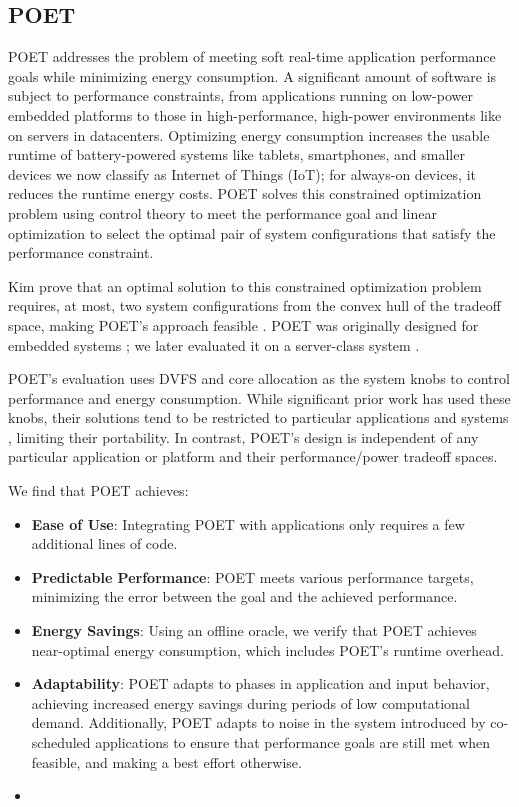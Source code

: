 \subsection{POET}

POET addresses the problem of meeting soft real-time application performance goals while minimizing energy consumption.
A significant amount of software is subject to performance constraints, from applications running on low-power embedded platforms to those in high-performance, high-power environments like on servers in datacenters.
Optimizing energy consumption increases the usable runtime of battery-powered systems like tablets, smartphones, and smaller devices we now classify as Internet of Things (IoT); for always-on devices, it reduces the runtime energy costs.
POET solves this constrained optimization problem using control theory to meet the performance goal and linear optimization to select the optimal pair of system configurations that satisfy the performance constraint.

Kim \etal prove that an optimal solution to this constrained optimization problem requires, at most, two system configurations from the convex hull of the tradeoff space, making POET's approach feasible \cite{kim-cpsna2015}.
POET was originally designed for embedded systems \cite{POET,ImesMS}; we later evaluated it on a server-class system \cite{POETMCSoC}.

POET's evaluation uses DVFS and core allocation as the system knobs to control performance and energy consumption.
While significant prior work has used these knobs, their solutions tend to be restricted to particular applications \cite{TODO} and systems \cite{TODO}, limiting their portability.
In contrast, POET's design is independent of any particular application or platform and their performance/power tradeoff spaces.

We find that POET achieves:
\begin{itemize}
\item \textbf{Ease of Use}: Integrating POET with applications only requires a few additional lines of code.
\item \textbf{Predictable Performance}: POET meets various performance targets, minimizing the error between the goal and the achieved performance.
\item \textbf{Energy Savings}: Using an offline oracle, we verify that POET achieves near-optimal energy consumption, which includes POET's runtime overhead.
\item \textbf{Adaptability}: POET adapts to phases in application and input behavior, achieving increased energy savings during periods of low computational demand.
Additionally, POET adapts to noise in the system introduced by co-scheduled applications to ensure that performance goals are still met when feasible, and making a best effort otherwise.
\item {}
\end{itemize}


